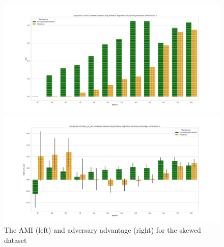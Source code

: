 \begin{figure}[H]
    \begin{minipage}[c]{0.55\textwidth}
        \includegraphics[width=\textwidth]{Results/RQ3/skewed-dataset/ami_skewed-dataset_comparison.png}
    \end{minipage}
    \begin{minipage}[c]{0.55\textwidth}
        \includegraphics[width=\textwidth]{Results/RQ3/skewed-dataset/shokri_mi_adv_skewed-dataset_comparison.png}
    \end{minipage}
    \label{fig:advantage_skewed-dataset_comparison}
    \caption{The AMI (left) and adversary advantage (right) for the skewed dataset}

\end{figure}